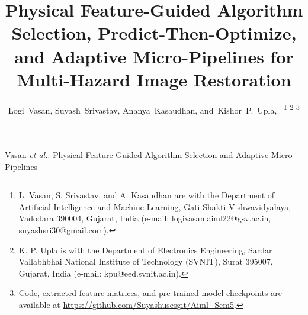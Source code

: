 \documentclass[journal]{IEEEtran}
\begin{document}
\title{Physical Feature-Guided Algorithm Selection, Predict-Then-Optimize, and Adaptive Micro-Pipelines for Multi-Hazard Image Restoration}

\author{Logi~Vasan,
        Suyash~Srivastav,
        Ananya~Kasaudhan,
        and~Kishor~P.~Upla,~%
\thanks{L. Vasan, S. Srivastav, and A. Kasaudhan are with the Department of Artificial Intelligence and Machine Learning, Gati Shakti Vishwavidyalaya, Vadodara 390004, Gujarat, India (e-mail: logivasan.aiml22@gsv.ac.in, suyashsri30@gmail.com).}%
\thanks{K. P. Upla is with the Department of Electronics Engineering, Sardar Vallabhbhai National Institute of Technology (SVNIT), Surat 395007, Gujarat, India (e-mail: kpu@eed.svnit.ac.in).}%
\thanks{Code, extracted feature matrices, and pre-trained model checkpoints are available at \url{https://github.com/Suyashusesgit/Aiml_Sem5}.}%
}

%
{Vasan \MakeLowercase{\textit{et al.}}: Physical Feature-Guided Algorithm Selection and Adaptive Micro-Pipelines}

\maketitle
\end{document}
